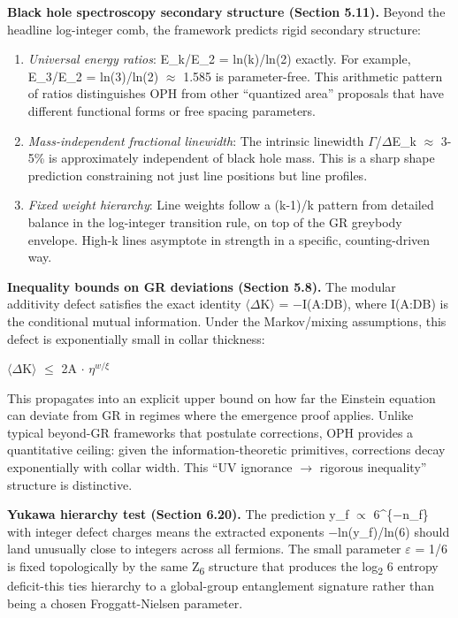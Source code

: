 \documentclass[11pt,a4paper]{article}
\theoremstyle{remark}
\begin{document}
\textbf{Black hole spectroscopy secondary structure (Section 5.11).} Beyond the headline log-integer comb, the framework predicts rigid secondary structure:

\begin{enumerate}
\def\labelenumi{\arabic{enumi}.}
\item
  \emph{Universal energy ratios}: E\_k/E\_2 = ln(k)/ln(2) exactly. For example, E\_3/E\_2 = ln(3)/ln(2) \ensuremath{\approx} 1.585 is parameter-free. This arithmetic pattern of ratios distinguishes OPH from other ``quantized area'' proposals that have different functional forms or free spacing parameters.
\item
  \emph{Mass-independent fractional linewidth}: The intrinsic linewidth \ensuremath{\Gamma}/\ensuremath{\Delta}E\_k \ensuremath{\approx} 3-5\% is approximately independent of black hole mass. This is a sharp shape prediction constraining not just line positions but line profiles.
\item
  \emph{Fixed weight hierarchy}: Line weights follow a (k-1)/k pattern from detailed balance in the log-integer transition rule, on top of the GR greybody envelope. High-k lines asymptote in strength in a specific, counting-driven way.
\end{enumerate}

\textbf{Inequality bounds on GR deviations (Section 5.8).} The modular additivity defect satisfies the exact identity \ensuremath{\langle}\ensuremath{\Delta}K\ensuremath{\rangle} = \ensuremath{-}I(A:D\textbar B), where I(A:D\textbar B) is the conditional mutual information. Under the Markov/mixing assumptions, this defect is exponentially small in collar thickness:

\textbar{}\ensuremath{\langle}\ensuremath{\Delta}K\ensuremath{\rangle}\textbar{} \ensuremath{\leq} 2\textbar A\textbar{} \ensuremath{\cdot} \(\eta^{w/\xi}\)

This propagates into an explicit upper bound on how far the Einstein equation can deviate from GR in regimes where the emergence proof applies. Unlike typical beyond-GR frameworks that postulate corrections, OPH provides a quantitative ceiling: given the information-theoretic primitives, corrections decay exponentially with collar width. This ``UV ignorance \ensuremath{\to} rigorous inequality'' structure is distinctive.

\textbf{Yukawa hierarchy test (Section 6.20).} The prediction y\_f \ensuremath{\propto} 6\^{}\{\ensuremath{-}n\_f\} with integer defect charges means the extracted exponents \ensuremath{-}ln(y\_f)/ln(6) should land unusually close to integers across all fermions. The small parameter \ensuremath{\varepsilon} = 1/6 is fixed topologically by the same Z\textsubscript{6} structure that produces the log\textsubscript{2} 6 entropy deficit-this ties hierarchy to a global-group entanglement signature rather than being a chosen Froggatt-Nielsen parameter.
\end{document}
